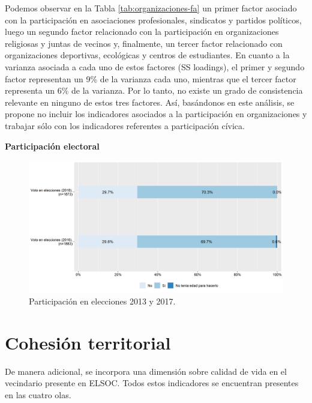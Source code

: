 \documentclass[
  12pt,
]{book}
\begin{document}
Podemos observar en la Tabla \ref{tab:organizaciones-fa} un primer factor asociado con la participación en asociaciones profesionales, sindicatos y partidos políticos, luego un segundo factor relacionado con la participación en organizaciones religiosas y juntas de vecinos y, finalmente, un tercer factor relacionado con organizaciones deportivas, ecológicas y centros de estudiantes. En cuanto a la varianza asociada a cada uno de estos factores (SS loadings), el primer y segundo factor representan un 9\% de la varianza cada uno, mientras que el tercer factor representa un 6\% de la varianza. Por lo tanto, no existe un grado de consistencia relevante en ninguno de estos tres factores. Así, basándonos en este análisis, se propone no incluir los indicadores asociados a la participación en organizaciones y trabajar sólo con los indicadores referentes a participación cívica.

\textbf{Participación electoral}

\begin{figure}[H]

{\centering \includegraphics[width=1\linewidth,height=1\textheight]{output/graphs/participacion-electoral} 

}

\caption{Participación en elecciones 2013 y 2017.}\label{fig:participacion-electoral}
\end{figure}

\hypertarget{cohesiuxf3n-territorial}{%
\section{Cohesión territorial}\label{cohesiuxf3n-territorial}}

De manera adicional, se incorpora una dimensión sobre calidad de vida en el vecindario presente en ELSOC. Todos estos indicadores se encuentran presentes en las cuatro olas.
\end{document}
